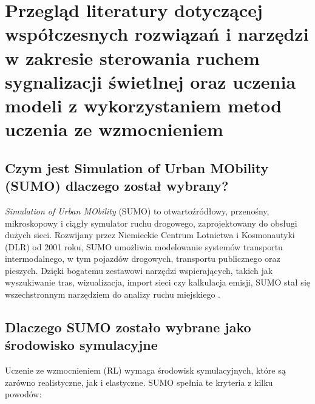 \documentclass[12pt, a4paper]{article} %
\begin{document}
    \section{Przegląd literatury dotyczącej współczesnych rozwiązań i narzędzi w zakresie sterowania ruchem sygnalizacji
    świetlnej oraz uczenia modeli z wykorzystaniem metod uczenia ze wzmocnieniem}

    \subsection{Czym jest Simulation of Urban MObility (SUMO) dlaczego został wybrany?}

    \textit{Simulation of Urban MObility} (SUMO)
    to otwartoźródłowy, przenośny, mikroskopowy i ciągły symulator ruchu drogowego, zaprojektowany do obsługi dużych
    sieci. Rozwijany przez Niemieckie Centrum Lotnictwa i Kosmonautyki (DLR) od 2001 roku, SUMO umożliwia modelowanie
    systemów transportu intermodalnego, w tym pojazdów drogowych, transportu publicznego oraz pieszych. Dzięki bogatemu
    zestawowi narzędzi wspierających, takich jak wyszukiwanie tras, wizualizacja, import sieci czy kalkulacja emisji,
    SUMO stał się wszechstronnym narzędziem do analizy ruchu miejskiego \cite{sumo_website}.

    \subsection{Dlaczego SUMO zostało wybrane jako środowisko symulacyjne}

    Uczenie ze wzmocnieniem (RL) wymaga środowisk symulacyjnych, które są zarówno realistyczne, jak i elastyczne. SUMO
    spełnia te kryteria z kilku powodów:
\end{document}
